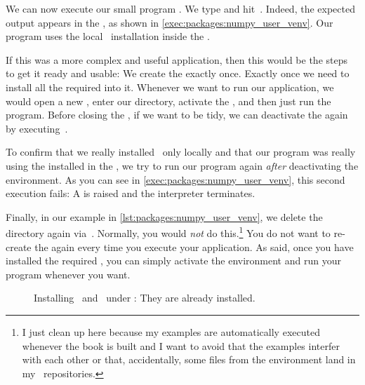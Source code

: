We can now execute our small program .
We type  and hit~\keys{\return}.
Indeed, the expected output  appears in the , as shown in \cref{exec:packages:numpy_user_venv}.
Our program uses the local \numpy\ installation inside the .

If this was a more complex and useful application, then this would be the steps to get it ready and usable:
We create the  exactly once.
Exactly once we need to install all the required  into it.
Whenever we want to run our application, we would open a new , enter our directory, activate the , and then just run the program.
Before closing the , if we want to be tidy, we can deactivate the  again by executing~.

To confirm that we really installed \numpy\ only locally and that our program was really using the  installed in the , we try to run our program again \emph{after} deactivating the environment.
As you can see in \cref{exec:packages:numpy_user_venv}, this second execution fails:
A  is raised and the interpreter terminates.%
%
\begin{sloppypar}%
Finally, in our example in \cref{lst:packages:numpy_user_venv}, we delete the  directory again via~.
Normally, you would \emph{not} do this.\footnote{%
I just clean up here because my examples are automatically executed whenever the book is built and I want to avoid that the examples interfer with each other or that, accidentally, some files from the environment land in my \git\ repositories.}%
You do not want to re-create the  again every time you execute your application.
As said, once you have installed the required , you can simply activate the environment and run your program whenever you want.%
\end{sloppypar}%
%
\FloatBarrier%
\endhsection%
%
%
%
\begin{figure}%
\centering%
%
\caption{Installing \pip\ and \venv\ under \windows: They are already installed.}%
\label{fig:installPipVenvWindows}%
\end{figure}%
\endhsection%
%
\FloatBarrier%
\endhsection%
%
\endhsection%
%
